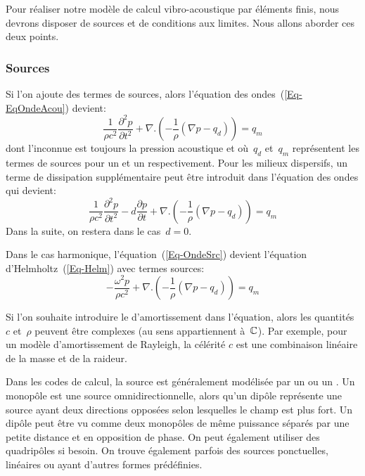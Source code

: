 Pour réaliser notre modèle de calcul vibro-acoustique par éléments finis, nous devrons disposer de sources et de conditions aux limites. Nous allons aborder ces deux points.

\medskip
\subsubsection{Sources}

Si l'on ajoute des termes de sources, alors l'équation des ondes~(\ref{Eq-EqOndeAcou}) devient:
\begin{equation}\label{Eq-OndeSrc}
\dfrac{1}{\rho c^2}\dfrac{\partial^2p}{\partial t^2}+\nabla.\left(-\dfrac{1}{\rho}(\nabla p-q_d)\right)=q_m
\end{equation}
dont l'inconnue est toujours la pression acoustique et où~$q_d$ et~$q_m$ représentent les termes de sources pour un  et un  respectivement.
Pour les milieux dispersifs, un terme de dissipation supplémentaire peut être introduit dans l'équation des ondes qui devient:
\begin{equation}\label{Eq-OndeSrcAmort}
\dfrac{1}{\rho c^2}\dfrac{\partial^2p}{\partial t^2}-d\dfrac{\partial p}{\partial t}+\nabla.\left(-\dfrac{1}{\rho}(\nabla p-q_d)\right)=q_m
\end{equation}
Dans la suite, on restera dans le cas~$d=0$.

Dans le cas harmonique, l'équation~(\ref{Eq-OndeSrc}) devient l'équation d'Helmholtz~(\ref{Eq-Helm}) avec termes sources:
\begin{equation}
-\dfrac{\omega^2p}{\rho c^2}+\nabla.\left(-\dfrac{1}{\rho}(\nabla p-q_d)\right)=q_m
\end{equation}
\begin{remarque}
Si l'on souhaite introduire le d'amortissement dans l'équation, alors les quantités~$c$ et~$\rho$ peuvent être complexes (au sens appartiennent à~$\mathbb C$). Par exemple, pour un modèle d'amortissement de Rayleigh, la célérité $c$ est une combinaison linéaire de la masse et de la raideur.
\end{remarque}

Dans les codes de calcul, la source est généralement modélisée par un  ou un . Un monopôle est une source omnidirectionnelle, alors qu'un dipôle représente une source ayant deux directions opposées selon lesquelles le champ est plus fort. Un dipôle peut être vu comme deux monopôles de même puissance séparés par une petite distance et en opposition de phase. On peut également utiliser des quadripôles si besoin.
   On trouve également parfois des sources ponctuelles, linéaires ou ayant d'autres formes prédéfinies.
   
